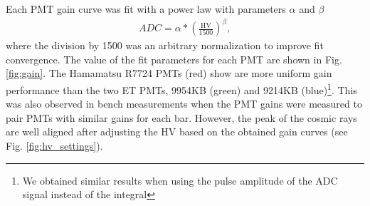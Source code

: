 \documentclass[3p,final,twocolumn]{elsarticle}
\begin{document}
Each PMT gain curve was fit with a power law with parameters $\alpha$ and $\beta$
\begin{eqnarray}
	ADC	= \alpha * \left(\frac{\mathrm{HV}}{1500}\right)^{\beta},				
		\label{eqn:gain_curve}
\end{eqnarray}
where the division by 1500 was an arbitrary normalization to improve fit convergence. The value of the fit parameters for each PMT are shown in Fig. \ref{fig:gain}. The Hamamatsu R7724 PMTs (red) show are more uniform gain performance than the two ET PMTs, 9954KB (green) and 9214KB (blue)\footnote{We obtained similar results when using the pulse amplitude of the ADC signal instead of the integral}. This was also observed in bench measurements when the PMT gains were measured to pair PMTs with similar gains for each bar.
However, the peak of the cosmic rays are well aligned after adjusting the HV based on the obtained gain curves (see Fig. \ref{fig:hv_settings}).
\end{document}
